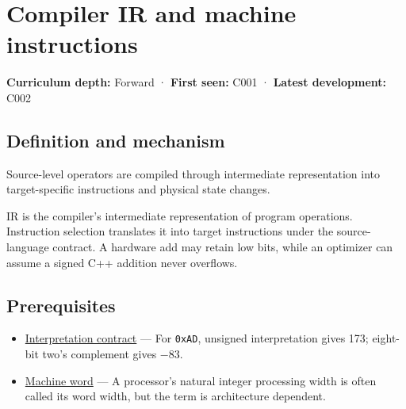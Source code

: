 \hypertarget{appendix-942ad41afb30}{}\label{referencestart:appendix-942ad41afb30}
\section{Compiler IR and machine instructions}\label{appendix-942ad41afb30-compiler-ir-and-machine-instructions}

\hypertarget{appendix-942ad41afb30-compiler-ir-and-machine-instructions}{}

\textbf{Curriculum depth:} Forward · \textbf{First seen:} C001 · \textbf{Latest development:} C002

\begin{allmightroledefinition}

\subsection{Definition and mechanism}\label{appendix-942ad41afb30-definition-and-mechanism}

\hypertarget{appendix-942ad41afb30-definition-and-mechanism}{}

Source-level operators are compiled through intermediate representation into target-specific instructions and physical state changes.

\end{allmightroledefinition}

IR is the compiler's intermediate representation of program operations. Instruction selection translates it into target instructions under the source-language contract. A hardware add may retain low bits, while an optimizer can assume a signed C++ addition never overflows.

\subsection{Prerequisites}\label{appendix-942ad41afb30-prerequisites}

\hypertarget{appendix-942ad41afb30-prerequisites}{}

\begin{itemize}
\tightlist
\item
  \hyperref[appendix-f414bd4ed05c]{Interpretation contract} --- For \texttt{0xAD}, unsigned interpretation gives 173; eight-bit two's complement gives −83.
\item
  \hyperref[appendix-d67a19507dc5]{Machine word} --- A processor's natural integer processing width is often called its word width, but the term is architecture dependent.
\end{itemize}

